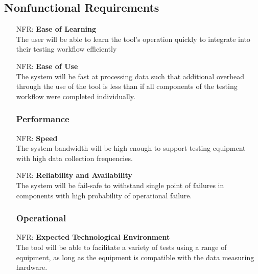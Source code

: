 \documentclass[12pt]{article}
\newcounter{nfrnum} %
\begin{document}
\newpage
\subsection{Nonfunctional Requirements}

\noindent\begin{itemize}

\subsubsection{Usability} 

    \item[NFR\refstepcounter{nfrnum}\thenfrnum:]
    \textbf{Ease of Learning}\\
    The user will be able to learn the tool's operation quickly to integrate into their testing workflow efficiently\\

    \item[NFR\refstepcounter{nfrnum}\thenfrnum:]
    \textbf{Ease of Use}\\
    The system will be fast at processing data such that additional overhead through the use of the tool is less than if all components of the testing workflow were completed individually.\\

\subsubsection{Performance} 

    \item[NFR\refstepcounter{nfrnum}\thenfrnum:]
    \textbf{Speed}\\
    The system bandwidth will be high enough to support testing equipment with high data collection frequencies.\\

    \item[NFR\refstepcounter{nfrnum}\thenfrnum:]
    \textbf{Reliability and Availability}\\
    The system will be fail-safe to withstand single point of failures in components with high probability of operational failure.\\

\subsubsection{Operational}

    \item[NFR\refstepcounter{nfrnum}\thenfrnum:]
      \textbf{Expected Technological Environment}\\
    The tool will be able to facilitate a variety of tests using a range of equipment, as long as the equipment is compatible with the data measuring hardware.\\


\end{itemize}
\end{document}
